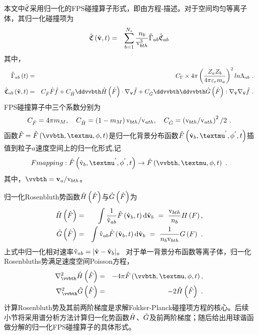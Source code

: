   本文中$\hat{\mathfrak{C}}$采用归一化的FPS碰撞算子形式，即由方程-描述。对于空间均匀等离子体，其归一化碰撞项为
  \begin{eqnarray}
      \hat{\mathfrak{C}} \left(\hat{\mathbf{v}},t \right) &=& \sum_{b=1}^{N_s} \frac{n_b}{\mathrm{v}_{bth}^3} \hat{\Gamma}_{ab} \hat{\mathfrak{C}}_{ab} \label{FPShda3}
  \end{eqnarray}
  其中，
  \begin{eqnarray}
      \Gabh \left(t \right) &=& C_{\Gamma} \times 4 \pi \left(\frac{Z_a Z_b}{4 \pi \varepsilon_r m_a} \right)^2 \lnAab ~. \label{Gabh3}  \\
      \colhab \left(\vh,t \right) &=& \CFh \Fh \fh + \CHh \ddvvbth \HFh \cdot \ddbfv \fh + \CGh \ddvvbth \ddvvbth \GFh : \ddbfvh \ddbfvh \fh ~. \label{FPShdab3}
  \end{eqnarray}
  FPS碰撞算子中三个系数分别为
  \begin{eqnarray}
      C_{\hat{F}}=4\pi m_M,  \quad  
      C_{\hat{H}}=\left(1-m_M \right) \mathrm{v}_{bth} / \mathrm{v}_{ath}, \quad 
      C_{\hat{G}}=\left(\mathrm{v}_{bth} / \mathrm{v}_{ath} \right)^2 / 2
      ~. \label{CFHGh3}          
  \end{eqnarray}
  函数$\Fh=\Fh\left(\vvbth,\mu,\phi,t \right)$是归一化背景分布函数$\Fh \left(\vhb,\mu^{'},\phi^{'},t \right)$插值到粒子$a$速度空间上的归一化形式,记
  \begin{eqnarray}
      Fmapping:\Fh \left(\rmvhb,\mu^{'},\phi^{'},t \right) \to \Fh\left(\vvbth,\mu,\phi,t \right)
      ~. \label{Fmapping}          
  \end{eqnarray}
  其中，$\vvbth=\v_a / \vbth $。
  
  归一化Rosenbluth势函数$\hat{H} \left(\hat{F} \right) $与$\hat{G} \left(\hat{F} \right)$为
  \begin{eqnarray}
    \hat{H} \left(\hat{F} \right) &=& \int \frac{1}{\hat{\mathrm{v}}_{ab}} \hat{F} \left(\hat{\mathbf{v}}_b,t \right) \mathrm{d} \hat{\mathbf{v}} _b \ = \  \frac{\mathrm{v}_{bth}}{n_b }  H \left(F \right), \label{Hh} \\
    \hat{G} \left(\hat{F} \right) &=& \int \hat{\mathrm{v}}_{ab} \hat{F} \left(\hat{\mathbf{v}}_b,t \right) \mathrm{d} \hat{\mathbf{v}} _b \ = \ \frac{1}{n_b \mathrm{v}_{bth}} G \left(F \right) ~. \label{Gh}
  \end{eqnarray}
  上式中归一化相对速率$\hat{\mathrm{v}}_{ab}=\left|\hat{\mathbf{v}}-\hat{\mathbf{v}}_b \right|$。
  对于单一背景分布函数等离子体，归一化Rosenbluths势满足速度空间Poisson方程，
  \begin{eqnarray}
      \nabla {_{\vvbth}^2} \HFh &=& - 4 \pi \Fh\left(\vvbth,\mu,\phi,t \right),  \label{PoissonHh} \\
      \nabla {_{\vvbth}^2} \GFh &=& - 2 \HFh ~. \label{PoissonGh}
  \end{eqnarray}
  计算Rosenbluth势及其前两阶梯度是求解Fokker-Planck碰撞项方程的核心。后续小节将采用谱分析方法计算归一化势函数$\hat{H}$、$\hat{G}$及前两阶梯度；随后给出用球谐函做分解的归一化FPS碰撞算子的具体形式。

